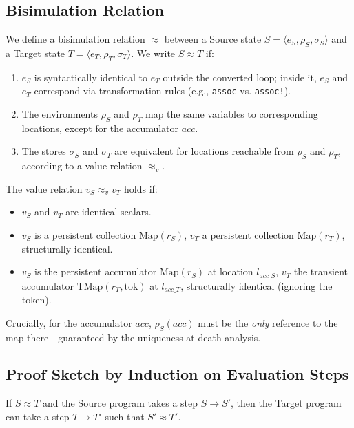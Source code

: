 \documentclass[sigplan,review,anonymous]{acmart}
\begin{document}
\subsection{Bisimulation Relation}

We define a bisimulation relation $\approx$ between a Source state $S = \langle e_S, \rho_S, \sigma_S \rangle$ and a Target state $T = \langle e_T, \rho_T, \sigma_T \rangle$. We write $S \approx T$ if:

\begin{enumerate}
    \item $e_S$ is syntactically identical to $e_T$ outside the converted loop; inside it, $e_S$ and $e_T$ correspond via transformation rules (e.g., \texttt{assoc} vs. \texttt{assoc!}).
    \item The environments $\rho_S$ and $\rho_T$ map the same variables to corresponding locations, except for the accumulator $acc$.
    \item The stores $\sigma_S$ and $\sigma_T$ are equivalent for locations reachable from $\rho_S$ and $\rho_T$, according to a value relation $\approx_v$.
\end{enumerate}

The value relation $v_S \approx_v v_T$ holds if:
\begin{itemize}
    \item $v_S$ and $v_T$ are identical scalars.
    \item $v_S$ is a persistent collection $\text{Map}(r_S)$, $v_T$ a persistent collection $\text{Map}(r_T)$, structurally identical.
    \item $v_S$ is the persistent accumulator $\text{Map}(r_S)$ at location $l_{acc\_S}$, $v_T$ the transient accumulator $\text{TMap}(r_T, \text{tok})$ at $l_{acc\_T}$, structurally identical (ignoring the token).
\end{itemize}

Crucially, for the accumulator $acc$, $\rho_S(acc)$ must be the \emph{only} reference to the map there---guaranteed by the uniqueness-at-death analysis.

\subsection{Proof Sketch by Induction on Evaluation Steps}

If $S \approx T$ and the Source program takes a step $S \rightarrow S'$, then the Target program can take a step $T \rightarrow T'$ such that $S' \approx T'$.
\end{document}
